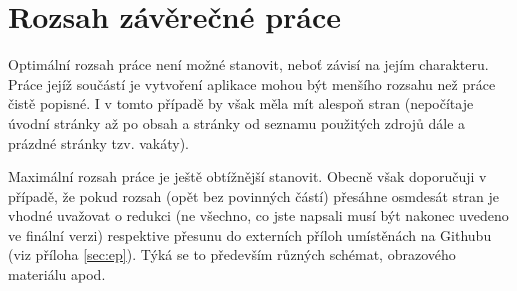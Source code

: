 \section{Rozsah závěrečné práce}

Optimální rozsah  práce není možné stanovit, neboť závisí na jejím charakteru. Práce jejíž součástí je vytvoření aplikace mohou být menšího rozsahu než práce čistě popisné. I v tomto případě by však měla mít alespoň  stran (nepočítaje úvodní stránky až po obsah a stránky od seznamu použitých zdrojů dále a prázdné stránky tzv. vakáty).

Maximální rozsah práce je ještě obtížnější stanovit. Obecně však doporučuji v případě, že pokud rozsah (opět bez povinných částí) přesáhne osmdesát stran je vhodné uvažovat o redukci (ne všechno, co jste napsali musí být nakonec uvedeno ve finální verzi) respektive přesunu do externích příloh umístěnách na Githubu (viz příloha \vref{sec:ep}). Týká se to především různých schémat, obrazového materiálu apod.